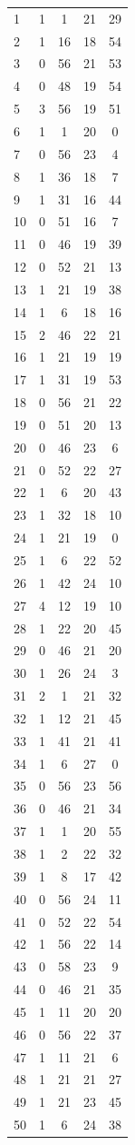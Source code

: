 \begin{appendices}
\begin{longtable}{lcccc}
1 & 1 & 1 & 21 & 29 \\
2 & 1 & 16 & 18 & 54 \\
3 & 0 & 56 & 21 & 53 \\
4 & 0 & 48 & 19 & 54 \\
5 & 3 & 56 & 19 & 51 \\
6 & 1 & 1 & 20 & 0 \\
7 & 0 & 56 & 23 & 4 \\
8 & 1 & 36 & 18 & 7 \\
9 & 1 & 31 & 16 & 44 \\
10 & 0 & 51 & 16 & 7 \\
11 & 0 & 46 & 19 & 39 \\
12 & 0 & 52 & 21 & 13 \\
13 & 1 & 21 & 19 & 38 \\
14 & 1 & 6 & 18 & 16 \\
15 & 2 & 46 & 22 & 21 \\
16 & 1 & 21 & 19 & 19 \\
17 & 1 & 31 & 19 & 53 \\
18 & 0 & 56 & 21 & 22 \\
19 & 0 & 51 & 20 & 13 \\
20 & 0 & 46 & 23 & 6 \\
21 & 0 & 52 & 22 & 27 \\
22 & 1 & 6 & 20 & 43 \\
23 & 1 & 32 & 18 & 10 \\
24 & 1 & 21 & 19 & 0 \\
25 & 1 & 6 & 22 & 52 \\
26 & 1 & 42 & 24 & 10 \\
27 & 4 & 12 & 19 & 10 \\
28 & 1 & 22 & 20 & 45 \\
29 & 0 & 46 & 21 & 20 \\
30 & 1 & 26 & 24 & 3 \\
31 & 2 & 1 & 21 & 32 \\
32 & 1 & 12 & 21 & 45 \\
33 & 1 & 41 & 21 & 41 \\
34 & 1 & 6 & 27 & 0 \\
35 & 0 & 56 & 23 & 56 \\
36 & 0 & 46 & 21 & 34 \\
37 & 1 & 1 & 20 & 55 \\
38 & 1 & 2 & 22 & 32 \\
39 & 1 & 8 & 17 & 42 \\
40 & 0 & 56 & 24 & 11 \\
41 & 0 & 52 & 22 & 54 \\
42 & 1 & 56 & 22 & 14 \\
43 & 0 & 58 & 23 & 9 \\
44 & 0 & 46 & 21 & 35 \\
45 & 1 & 11 & 20 & 20 \\
46 & 0 & 56 & 22 & 37 \\
47 & 1 & 11 & 21 & 6 \\
48 & 1 & 21 & 21 & 27 \\
49 & 1 & 21 & 23 & 45 \\
50 & 1 & 6 & 24 & 38 \\
\bottomrule
\end{longtable}


\end{appendices}
